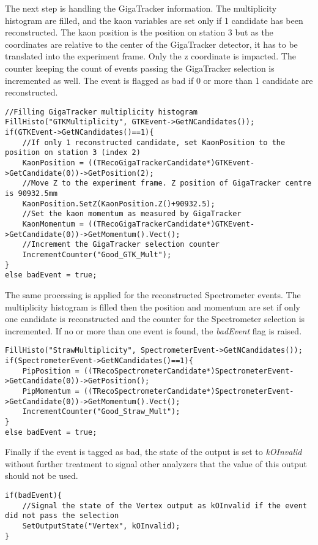 \documentclass{article}
\newcommand{\var}[1]{\textit{#1}}
\begin{document}
The next step is handling the GigaTracker information. The multiplicity histogram are filled,
and the kaon variables are set only if 1 candidate has been reconstructed. The kaon position is the
position on station 3 but as the coordinates are relative to the center of the GigaTracker
detector, it has to be translated into the experiment frame. Only the z coordinate is impacted.
The counter keeping the count of events passing the GigaTracker selection is incremented as well.
The event is flagged as bad if 0 or more than 1 candidate are reconstructed.

\begin{lstlisting}
//Filling GigaTracker multiplicity histogram
FillHisto("GTKMultiplicity", GTKEvent->GetNCandidates());
if(GTKEvent->GetNCandidates()==1){
	//If only 1 reconstructed candidate, set KaonPosition to the position on station 3 (index 2)
	KaonPosition = ((TRecoGigaTrackerCandidate*)GTKEvent->GetCandidate(0))->GetPosition(2);
	//Move Z to the experiment frame. Z position of GigaTracker centre is 90932.5mm  
	KaonPosition.SetZ(KaonPosition.Z()+90932.5);
	//Set the kaon momentum as measured by GigaTracker
	KaonMomentum = ((TRecoGigaTrackerCandidate*)GTKEvent->GetCandidate(0))->GetMomentum().Vect();
	//Increment the GigaTracker selection counter
	IncrementCounter("Good_GTK_Mult");
}
else badEvent = true;
\end{lstlisting}

The same processing is applied for the reconstructed Spectrometer events. The multiplicity 
histogram is filled then the position and momentum are set if only one candidate is reconstructed
and the counter for the Spectrometer selection is incremented. If no or more than one event is
found, the \var{badEvent} flag is raised.

\begin{lstlisting}
FillHisto("StrawMultiplicity", SpectrometerEvent->GetNCandidates());
if(SpectrometerEvent->GetNCandidates()==1){
	PipPosition = ((TRecoSpectrometerCandidate*)SpectrometerEvent->GetCandidate(0))->GetPosition();
	PipMomentum = ((TRecoSpectrometerCandidate*)SpectrometerEvent->GetCandidate(0))->GetMomentum().Vect();
	IncrementCounter("Good_Straw_Mult");
}
else badEvent = true;
\end{lstlisting}

Finally if the event is tagged as bad, the state of the output is set to \var{kOInvalid} without
further treatment to signal other analyzers that the value of this output should not be used. 

\begin{lstlisting}
if(badEvent){
	//Signal the state of the Vertex output as kOInvalid if the event did not pass the selection
	SetOutputState("Vertex", kOInvalid);
}
\end{lstlisting}
\end{document}
